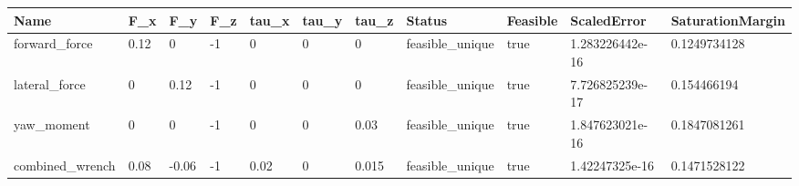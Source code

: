 \begin{tabular}{@{}lllllllllll@{}}
\toprule
Name & F\_x & F\_y & F\_z & tau\_x & tau\_y & tau\_z & Status & Feasible & ScaledError & SaturationMargin \\
\midrule
forward\_force & 0.12 & 0 & -1 & 0 & 0 & 0 & feasible\_unique & true & 1.283226442e-16 & 0.1249734128 \\
lateral\_force & 0 & 0.12 & -1 & 0 & 0 & 0 & feasible\_unique & true & 7.726825239e-17 & 0.154466194 \\
yaw\_moment & 0 & 0 & -1 & 0 & 0 & 0.03 & feasible\_unique & true & 1.847623021e-16 & 0.1847081261 \\
combined\_wrench & 0.08 & -0.06 & -1 & 0.02 & 0 & 0.015 & feasible\_unique & true & 1.42247325e-16 & 0.1471528122 \\
\bottomrule
\end{tabular}
